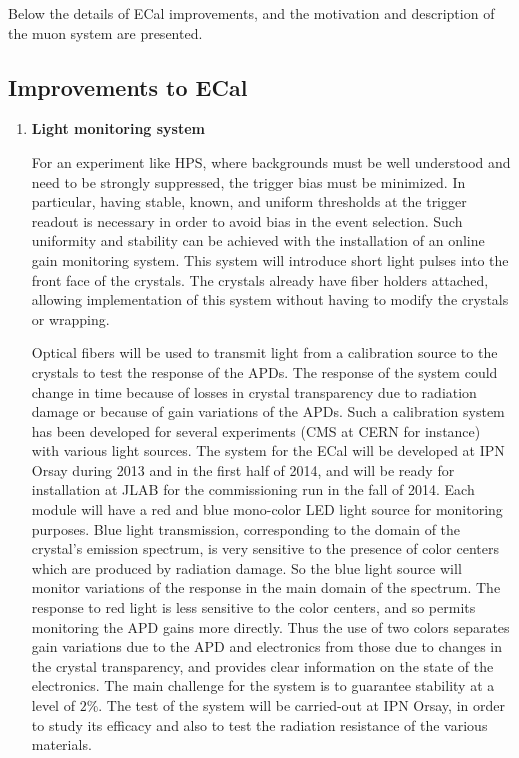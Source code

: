 Below the details of ECal improvements, and the motivation and description of the muon system are presented. 

\subsection{Improvements to ECal}

\begin{enumerate}
\item {\bf Light monitoring system}

For an experiment like HPS, where backgrounds must be well understood and need to be strongly suppressed, the trigger bias must be minimized. In particular, having stable, known, and uniform thresholds at the trigger readout is necessary in order to avoid  bias in the 
event selection. Such uniformity and stability can be achieved with the installation of an online gain monitoring 
system. This system will introduce short light pulses into the front face of the crystals. The crystals already have fiber holders attached, allowing implementation of this system without having to modify the crystals or wrapping. 

Optical fibers will be used to transmit light from a calibration  source to the crystals to test the response of the APDs. The response of the system could change in time because of 
losses in crystal transparency due to radiation damage or because of gain variations of the APDs. 
Such a calibration system has been developed for several experiments (CMS at CERN for instance) with various light sources. The system for the ECal 
will be developed at IPN Orsay during 2013 and in the first half of 2014, and will be ready for installation at JLAB for the commissioning run in the fall of 2014. Each module will have a red and blue mono-color LED light source for monitoring purposes. 
Blue light transmission, corresponding to the domain of the crystal's emission spectrum, is very sensitive to the presence of color centers which are produced by radiation damage. So the blue light source will monitor variations of the response in the main domain of the spectrum.
The response to red light is less sensitive to the color centers,  and so permits monitoring the APD gains more directly. Thus the use of two colors separates gain variations due to the 
APD and electronics from those due to changes in the crystal transparency, and provides clear information on the state of the electronics. 
The main challenge for the system is to guarantee stability at a level of $2\%$. The test of the system will be carried-out at
IPN Orsay, in order to study its efficacy and also to test the radiation resistance of the various materials.


\end{enumerate}
